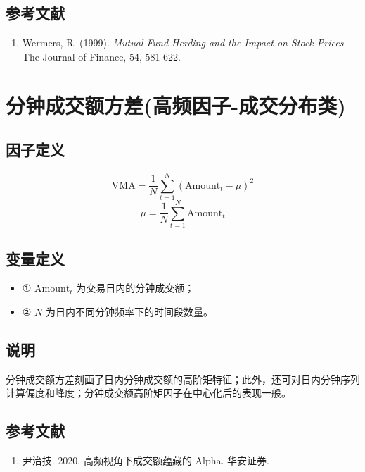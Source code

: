 \documentclass{article}
\begin{document}
\subsection{参考文献}
\begin{enumerate}
    \item Wermers, R. (1999). \textit{Mutual Fund Herding and the Impact on Stock Prices}. The Journal of Finance, 54, 581-622.
\end{enumerate}

\section{分钟成交额方差(高频因子-成交分布类)}

\subsection{因子定义}
\begin{equation}
    \mathrm{VMA} = \frac{1}{N} \sum_{t=1}^{N} (\mathrm{Amount}_t - \mu)^2
\end{equation}
\begin{equation}
    \mu = \frac{1}{N} \sum_{t=1}^{N} \mathrm{Amount}_t
\end{equation}

\subsection{变量定义}
\begin{itemize}
    \item ① \( \mathrm{Amount}_t \) 为交易日内的分钟成交额；
    \item ② \( N \) 为日内不同分钟频率下的时间段数量。
\end{itemize}

\subsection{说明}
分钟成交额方差刻画了日内分钟成交额的高阶矩特征；此外，还可对日内分钟序列计算偏度和峰度；分钟成交额高阶矩因子在中心化后的表现一般。

\subsection{参考文献}
\begin{enumerate}
    \item 尹治技. 2020. 高频视角下成交额蕴藏的 Alpha. 华安证券.
\end{enumerate}
\end{document}

